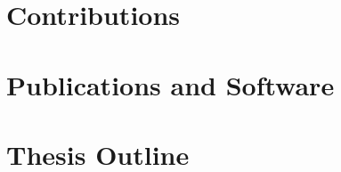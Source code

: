 \section{Contributions}
\label{sec:intro-contributions}

\section{Publications and Software}
\label{sec:intro-publications}

\section{Thesis Outline}
\label{sec:intro-outline}
